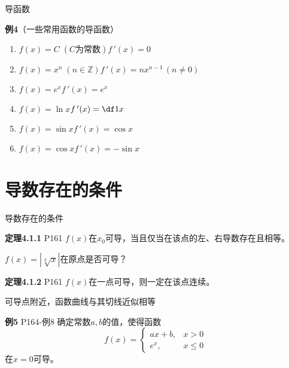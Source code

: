 \begin{frame}{导函数}
	\linespread{1.2}\pause 
	\begin{alertblock}{{\bf 例4}（一些常用函数的导函数） \hfill }\pause 
		\begin{enumerate}
		  \item $f(x)=C\;(C\mbox{为常数})$\pause \hfill $f\,'(x)=0$\pause 
		  \item $f(x)=x^n\;(n\in\mathbb{Z})$\pause \hfill $f\,'(x)=nx^{n-1}\,(n\ne
		  0)$\pause 
		  \item $f(x)=e^x$\pause \hfill $f\,'(x)=e^x$\pause 
		  \item $f(x)=\ln x$\pause \hfill $f\,'(x)=\df 1x$\pause 
		  \item $f(x)=\sin x$\pause \hfill $f\,'(x)=\cos x$\pause 
		  \item $f(x)=\cos x$\pause \hfill $f\,'(x)=-\sin x$
		\end{enumerate}
	\end{alertblock}
\end{frame}

\section{导数存在的条件}

\begin{frame}{导数存在的条件}
	\linespread{1.5}\pause 
	\begin{block}{{\bf 定理4.1.1} \hfill P161}
		$f(x)$在$x_0$可导，当且仅当在该点的左、右导数存在且相等。
	\end{block}\pause 
	{}$f(x)=|{\sqrt[3]x}|$在原点是否可导？\pause
	\begin{block}{{\bf 定理4.1.2} \hfill P161}
		$f(x)$在一点可导，则一定在该点连续。
	\end{block}\pause 
	{}可导点附近，函数曲线与其切线近似相等
\end{frame}

\begin{frame}
	\linespread{1.2}
	\begin{exampleblock}{{\bf 例5} \hfill P164-例8}
		确定常数$a,b$的值，使得函数
		$$f(x)=\left\{
		\begin{array}{ll}
		ax+b,& x>0\\
		e^x,& x\leq 0
		\end{array}
		\right.$$
		在$x=0$可导。
	\end{exampleblock}
\end{frame}

